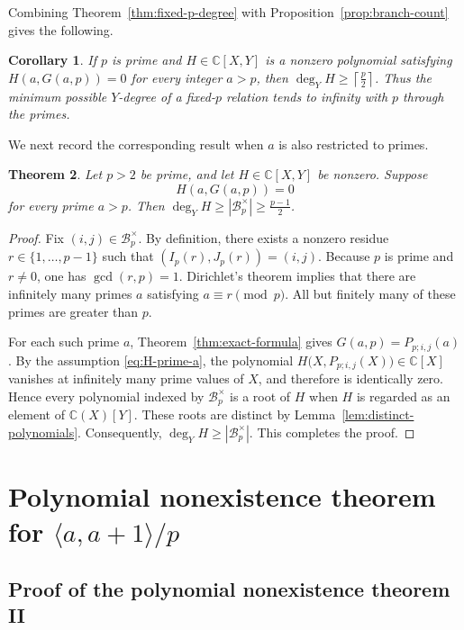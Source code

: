\documentclass[reqno, 12pt]{article}
\numberwithin{equation}{section}
\newtheorem{theorem}{Theorem}[section]
\newtheorem{corollary}[theorem]{Corollary}
\theoremstyle{definition}
\newcommand{\CC}{\mathbb{C}}
\newcommand{\cB}{\mathcal B}
\begin{document}
Combining Theorem~\ref{thm:fixed-p-degree} with Proposition~\ref{prop:branch-count} gives the following.

\begin{corollary}\label{cor:unbounded-fixed-p}
If $p$ is prime and $H\in\CC[X,Y]$ is a nonzero polynomial satisfying $H(a,G(a,p))=0$ for every integer $a>p$, then $\deg_YH\ge\left\lceil\frac{p}{2}\right\rceil$.
Thus the minimum possible $Y$-degree of a fixed-$p$ relation tends to infinity with $p$ through the primes.
\end{corollary}


We next record the corresponding result when $a$ is also restricted to primes.  

\begin{theorem}\label{thm:fixed-p-prime-a}
Let $p>2$ be prime, and let $H\in\CC[X,Y]$ be nonzero.  Suppose
\begin{equation}\label{eq:H-prime-a}
   H(a,G(a,p))=0
\end{equation}
for every prime $a>p$. Then $\deg_YH\ge|\cB_p^{\times}|\ge\frac{p-1}{2}$.
\end{theorem}
\begin{proof}
Fix $(i,j)\in\cB_p^{\times}$.  By definition, there exists a nonzero residue
$r\in\{1,\ldots,p-1\}$ such that $(I_p(r),J_p(r))=(i,j)$.
Because $p$ is prime and $r\ne0$, one has $\gcd(r,p)=1$.  Dirichlet's theorem
implies that there are infinitely many primes $a$ satisfying
$a\equiv r\pmod p$.  All but finitely many of these primes are greater than
$p$.

For each such prime $a$, Theorem~\ref{thm:exact-formula} gives $G(a,p)=P_{p;i,j}(a)$.
By the assumption \cref{eq:H-prime-a}, the polynomial $H\bigl(X,P_{p;i,j}(X)\bigr)\in\CC[X]$
vanishes at infinitely many prime values of $X$, and therefore is identically
zero.  Hence every polynomial indexed by $\cB_p^{\times}$ is a root of
$H$ when $H$ is regarded as an element of $\CC(X)[Y]$.  These roots are
distinct by Lemma~\ref{lem:distinct-polynomials}.  Consequently, $\deg_YH\ge|\cB_p^{\times}|$. This completes the proof.
\end{proof}

\section{Polynomial nonexistence theorem for $\langle a,a+1\rangle/p$}\label{sec:global}


\subsection{Proof of the polynomial nonexistence theorem II}
\end{document}
